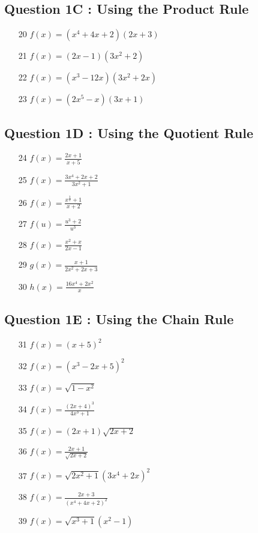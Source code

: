\documentclass[]{article}
\begin{document}
\subsection*{Question 1C : Using the Product Rule}
{
	\Large
	\begin{multicols}{2}
		\begin{itemize}
			\item[20] $ f(x) = (x^4+4x+2)(2x+3) $ \,
			\item[21] $ f(x) = (2x-1)(3x^2+2) $ \,
			\item[22] $ f(x) = (x^3-12x)(3x^2+2x) $ \,
			\item[23] $ f(x) = (2x^5-x)(3x+1) $ \,
		\end{itemize}
	\end{multicols}
}
\subsection*{Question 1D : Using the Quotient Rule}
{
	\Large
	\begin{multicols}{2}
		\begin{itemize}
			\item[24] $ f(x) = \frac{2x+1}{x+5} $ \,
			\item[25] $ f(x) = \frac{3x^4+2x +2}{3x^2+1} $ \,
			\item[26] $ f(x) = \frac{x^\frac{3}{2}+1}{x+2} $ \,
			\item[27] $ f(u) = \frac{u^3+2}{u^3} $ \,
			\item[28] $ f(x) = \frac{x^2+x}{2x-1} $ \,
			\item[29] $ g(x) = \frac{x+1}{2x^2+2x+3} $ \,
			\item[30] $ h(x) = \frac{16x^4+2x^2}{x} $ \,
			\end{itemize}
			\end{multicols}
		}
\subsection*{Question 1E : Using the Chain Rule}
		{
			\Large
			\begin{multicols}{2}
			\begin{itemize}
			\item[31] $ f(x) = (x+5)^2 $ \,
			\item[32] $ f(x) = (x^3 - 2x + 5)^2 $ \,\,
			\item[33] $ f(x) = \sqrt{1-x^2} $ \, 
			\item[34] $ f(x) = \frac{(2x+4)^3}{4x^3+1} $ \,
			\item[35] $ f(x) = (2x+1)\sqrt{2x+2} $ \,\,
			\item[36] $ f(x) = \frac{2x+1}{\sqrt{2x+2}} $ \,
			\item[37] $ f(x) = \sqrt{2x^2+1}(3x^4+2x)^2 $ \,
			\item[38] $ f(x) = \frac{2x+3}{(x^4+4x+2)^2} $ \,
			\item[39] $ f(x) = \sqrt{x^3+1}(x^2-1) $ \,
		\end{itemize}
	\end{multicols}
}
\end{document}
